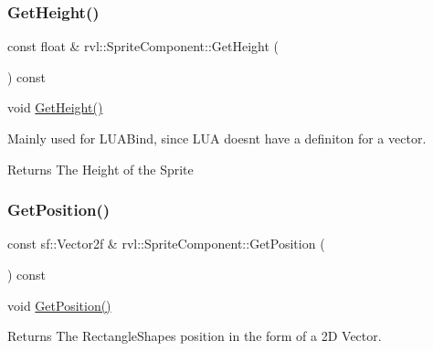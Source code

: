 \mbox{\label{classrvl_1_1_sprite_component_a411a43e5378af147ee73b4d5037d5d36}} 
\subsubsection{\texorpdfstring{Get\+Height()}{GetHeight()}}
{\footnotesize\ttfamily const float \& rvl\+::\+Sprite\+Component\+::\+Get\+Height (\begin{DoxyParamCaption}{ }\end{DoxyParamCaption}) const}



void \hyperlink{classrvl_1_1_sprite_component_a411a43e5378af147ee73b4d5037d5d36}{Get\+Height()} 

Mainly used for L\+U\+A\+Bind, since L\+UA doesn\textquotesingle{}t have a definiton for a vector.

\begin{DoxyReturn}{Returns}
The Height of the Sprite 
\end{DoxyReturn}
\mbox{\label{classrvl_1_1_sprite_component_a6408db6adf10872ff8495b2aac408bd8}} 
\subsubsection{\texorpdfstring{Get\+Position()}{GetPosition()}}
{\footnotesize\ttfamily const sf\+::\+Vector2f \& rvl\+::\+Sprite\+Component\+::\+Get\+Position (\begin{DoxyParamCaption}{ }\end{DoxyParamCaption}) const}



void \hyperlink{classrvl_1_1_sprite_component_a6408db6adf10872ff8495b2aac408bd8}{Get\+Position()} 

\begin{DoxyReturn}{Returns}
The Rectangle\+Shape\textquotesingle{}s position in the form of a 2D Vector. 
\end{DoxyReturn}
\mbox{\label{classrvl_1_1_sprite_component_a73f707ee88ac564b5a552b6605a2ae6f}} 
